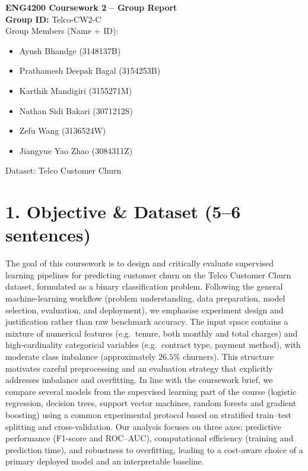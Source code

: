 \documentclass[11pt,a4paper]{article}
\begin{document}
\begin{center}
    {\LARGE \textbf{ENG4200 Coursework 2 – Group Report}}\\[0.5em]
    \textbf{Group ID:} Telco-CW2-C{\hspace{3cm}} \\[0.5em]
    Group Members (Name + ID): 
    \begin{itemize}
        \item Ayush Bhandge (3148137B)
        \item Prathamesh Deepak Bagal (3154253B)
        \item Karthik Mandigiri (3155271M)
        \item Nathan Sidi Bakari (3071212S)
        \item Zefu Wang (3136524W)
        \item Jiangyue Yao Zhao (3084311Z)
    \end{itemize}
    Dataset: Telco Customer Churn{\hspace{6cm}}
\end{center}

\vspace{1em}

\section*{1. Objective \& Dataset (5--6 sentences)}

The goal of this coursework is to design and critically evaluate supervised learning pipelines for predicting customer churn on the Telco Customer Churn dataset, formulated as a binary classification problem. Following the general machine-learning workflow (problem understanding, data preparation, model selection, evaluation, and deployment), we emphasise experiment design and justification rather than raw benchmark accuracy. The input space contains a mixture of numerical features (e.g.\ tenure, both monthly and total charges) and high-cardinality categorical variables (e.g.\ contract type, payment method), with moderate class imbalance (approximately $26.5\%$ churners). This structure motivates careful preprocessing and an evaluation strategy that explicitly addresses imbalance and overfitting. In line with the coursework brief, we compare several models from the supervised learning part of the course (logistic regression, decision trees, support vector machines, random forests and gradient boosting) using a common experimental protocol based on stratified train–test splitting and cross-validation. Our analysis focuses on three axes: predictive performance (F1-score and ROC--AUC), computational efficiency (training and prediction time), and robustness to overfitting, leading to a cost-aware choice of a primary deployed model and an interpretable baseline.
\end{document}
